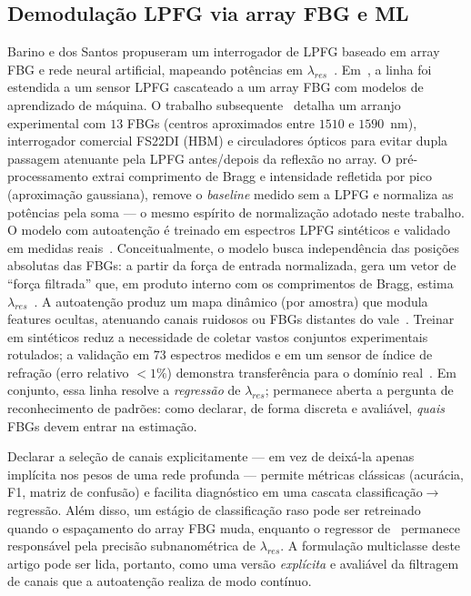 \documentclass[conference]{IEEEtran}
\begin{document}
\subsection{Demodulação LPFG via array FBG e ML}
Barino e dos Santos propuseram um interrogador de LPFG baseado em array FBG e rede neural artificial, mapeando potências em $\lambda_{res}$~\cite{Barino2020Sensors}.
Em~\cite{Barino2024LAWOFS}, a linha foi estendida a um sensor LPFG cascateado a um array FBG com modelos de aprendizado de máquina.
O trabalho subsequente~\cite{Barino2025TIM} detalha um arranjo experimental com $13$ FBGs (centros aproximados entre $1510$ e $1590$~nm), interrogador comercial FS22DI (HBM) e circuladores ópticos para evitar dupla passagem atenuante pela LPFG antes/depois da reflexão no array.
O pré-processamento extrai comprimento de Bragg e intensidade refletida por pico (aproximação gaussiana), remove o \emph{baseline} medido sem a LPFG e normaliza as potências pela soma --- o mesmo espírito de normalização adotado neste trabalho.
O modelo com autoatenção é treinado em espectros LPFG sintéticos e validado em medidas reais~\cite{Barino2025TIM}.
Conceitualmente, o modelo busca independência das posições absolutas das FBGs: a partir da força de entrada normalizada, gera um vetor de ``força filtrada'' que, em produto interno com os comprimentos de Bragg, estima $\lambda_{res}$~\cite{Barino2025TIM}.
A autoatenção produz um mapa dinâmico (por amostra) que modula features ocultas, atenuando canais ruidosos ou FBGs distantes do vale~\cite{Barino2025TIM}.
Treinar em sintéticos reduz a necessidade de coletar vastos conjuntos experimentais rotulados; a validação em $73$ espectros medidos e em um sensor de índice de refração (erro relativo $<1\%$) demonstra transferência para o domínio real~\cite{Barino2025TIM}.
Em conjunto, essa linha resolve a \emph{regressão} de $\lambda_{res}$; permanece aberta a pergunta de reconhecimento de padrões: como declarar, de forma discreta e avaliável, \emph{quais} FBGs devem entrar na estimação.

Declarar a seleção de canais explicitamente --- em vez de deixá-la apenas implícita nos pesos de uma rede profunda --- permite métricas clássicas (acurácia, F1, matriz de confusão) e facilita diagnóstico em uma cascata classificação$\to$regressão.
Além disso, um estágio de classificação raso pode ser retreinado quando o espaçamento do array FBG muda, enquanto o regressor de~\cite{Barino2025TIM} permanece responsável pela precisão subnanométrica de $\lambda_{res}$.
A formulação multiclasse deste artigo pode ser lida, portanto, como uma versão \emph{explícita} e avaliável da filtragem de canais que a autoatenção realiza de modo contínuo.
\end{document}
